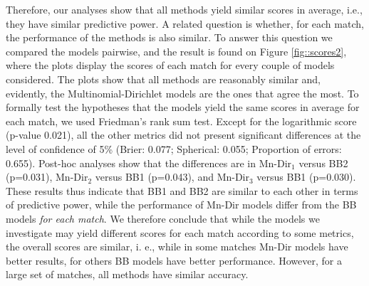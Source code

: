 \documentclass[journal,article,accept,moreauthors,pdftex,12pt,a4paper]{mdpi}
\begin{document}
	
	{\color{darkgreen}Therefore, our analyses show that all methods yield similar scores in average, i.e., they have similar predictive power. A related question
	is whether, for each match, the performance of the methods is also similar. To answer this question we compared the models pairwise, and the result is found on Figure \ref{fig::scores2}, where the plots display the scores of each match for every couple of models considered. The plots show that all methods are reasonably similar and, evidently, the Multinomial-Dirichlet models
	are the ones that agree the most. To formally test the hypotheses that the models yield the same scores in average for each match, we used Friedman's rank sum test. Except for the logarithmic score (p-value 0.021), all the other metrics did not present significant differences at the level of confidence of 5\% (Brier: 0.077; Spherical: 0.055; Proportion of errors: 0.655). Post-hoc analyses show that the differences are in Mn-Dir$_1$ versus BB2 (p=0.031),
	Mn-Dir$_2$ versus BB1 (p=0.043), and Mn-Dir$_3$ versus BB1 (p=0.030). These results thus indicate that BB1 and BB2
	are similar to each other in terms of predictive power, while the performance of Mn-Dir models differ from the BB models \emph{for each match}.
	We therefore conclude that while the models we investigate may yield different scores for each
	match according to some metrics, the overall scores are similar, i. e., while in some matches Mn-Dir models
	have better results, for others BB models have better performance. However, for a large set of matches, all methods have similar accuracy.
	}
	
\end{document}
